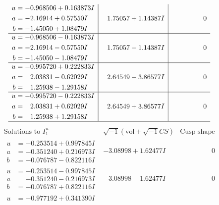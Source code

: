 \documentclass[1p]{elsarticle_modified}
\theoremstyle{definition}
\newcommand{\I}{\sqrt{-1}}
\begin{document}
$$\begin{array}{c|c|c}
\begin{aligned}
u &= -0.968506 + 0.163873 I \\
a &= -2.16914 + 0.57550 I \\
b &= -1.45050 + 1.08479 I\end{aligned}
 & \phantom{-}1.75057 + 1.14387 I & \phantom{-0.000000 } 0 \\ \hline\begin{aligned}
u &= -0.968506 - 0.163873 I \\
a &= -2.16914 - 0.57550 I \\
b &= -1.45050 - 1.08479 I\end{aligned}
 & \phantom{-}1.75057 - 1.14387 I & \phantom{-0.000000 } 0 \\ \hline\begin{aligned}
u &= -0.995720 + 0.222833 I \\
a &= \phantom{-}2.03831 - 0.62029 I \\
b &= \phantom{-}1.25938 - 1.29158 I\end{aligned}
 & \phantom{-}2.64549 - 3.86577 I & \phantom{-0.000000 } 0 \\ \hline\begin{aligned}
u &= -0.995720 - 0.222833 I \\
a &= \phantom{-}2.03831 + 0.62029 I \\
b &= \phantom{-}1.25938 + 1.29158 I\end{aligned}
 & \phantom{-}2.64549 + 3.86577 I & \phantom{-0.000000 } 0\\
 \hline 
 \end{array}$$\newpage$$\begin{array}{c|c|c}  
\text{Solutions to }I^u_{1}& \I (\text{vol} + \sqrt{-1}CS) & \text{Cusp shape}\\
 \hline 
\begin{aligned}
u &= -0.253514 + 0.997845 I \\
a &= -0.351240 + 0.216973 I \\
b &= -0.076787 - 0.822116 I\end{aligned}
 & -3.08998 + 1.62477 I & \phantom{-0.000000 } 0 \\ \hline\begin{aligned}
u &= -0.253514 - 0.997845 I \\
a &= -0.351240 - 0.216973 I \\
b &= -0.076787 + 0.822116 I\end{aligned}
 & -3.08998 - 1.62477 I & \phantom{-0.000000 } 0 \\ \hline\begin{aligned}
u &= -0.977192 + 0.341390 I \\

\end{aligned}
\end{array}$$
\end{document}
